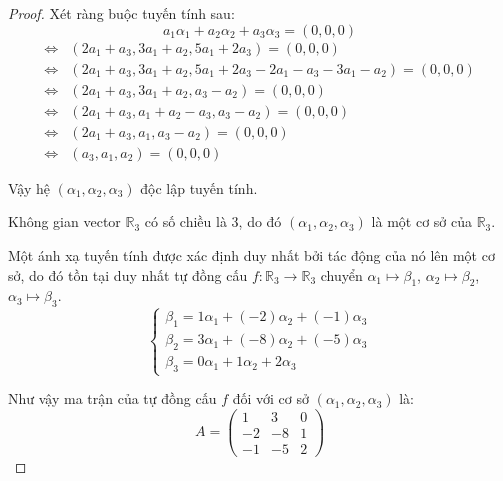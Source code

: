 \documentclass[class=nhvh-linear-algebra,crop=false]{standalone}
\begin{document}
\begin{proof}
    Xét ràng buộc tuyến tính sau:
    \[
        a_{1}\alpha_{1} + a_{2}\alpha_{2} + a_{3}\alpha_{3} = (0,0,0)
    \]
    \begin{align*}
        \Leftrightarrow & (2a_{1} + a_{3}, 3a_{1} + a_{2}, 5a_{1} + 2a_{3}) = (0,0,0)                                   \\
        \Leftrightarrow & (2a_{1} + a_{3}, 3a_{1} + a_{2}, 5a_{1} + 2a_{3} - 2a_{1} - a_{3} - 3a_{1} - a_{2}) = (0,0,0) \\
        \Leftrightarrow & (2a_{1} + a_{3}, 3a_{1} + a_{2}, a_{3} - a_{2}) = (0,0,0)                                     \\
        \Leftrightarrow & (2a_{1} + a_{3}, a_{1} + a_{2} - a_{3}, a_{3} - a_{2}) = (0,0,0)                              \\
        \Leftrightarrow & (2a_{1} + a_{3}, a_{1}, a_{3} - a_{2}) = (0,0,0)                                              \\
        \Leftrightarrow & (a_{3}, a_{1}, a_{2}) = (0,0,0)
    \end{align*}
    \par Vậy hệ $(\alpha_{1}, \alpha_{2}, \alpha_{3})$ độc lập tuyến tính.
    \par Không gian vector $\mathbb{R}_{3}$ có số chiều là 3, do đó $(\alpha_{1}, \alpha_{2}, \alpha_{3})$ là một cơ sở của $\mathbb{R}_{3}$.
    \par Một ánh xạ tuyến tính được xác định duy nhất bởi tác động của nó lên một cơ sở, do đó tồn tại duy nhất tự đồng cấu $f: \mathbb{R}_{3}\to\mathbb{R}_{3}$ chuyển $\alpha_{1}\mapsto\beta_{1}$, $\alpha_{2}\mapsto\beta_{2}$, $\alpha_{3}\mapsto\beta_{3}$.
    \[
        \begin{cases}
            \beta_{1} = 1\alpha_{1} + (-2)\alpha_{2} + (-1)\alpha_{3} \\
            \beta_{2} = 3\alpha_{1} + (-8)\alpha_{2} + (-5)\alpha_{3} \\
            \beta_{3} = 0\alpha_{1} + 1\alpha_{2} + 2\alpha_{3}
        \end{cases}
    \]
    \par Như vậy ma trận của tự đồng cấu $f$ đối với cơ sở $(\alpha_{1}, \alpha_{2}, \alpha_{3})$ là:
    \[
        A =
        \begin{pmatrix}
            1  & 3  & 0 \\
            -2 & -8 & 1 \\
            -1 & -5 & 2
        \end{pmatrix}
\]
\end{proof}
\end{document}

